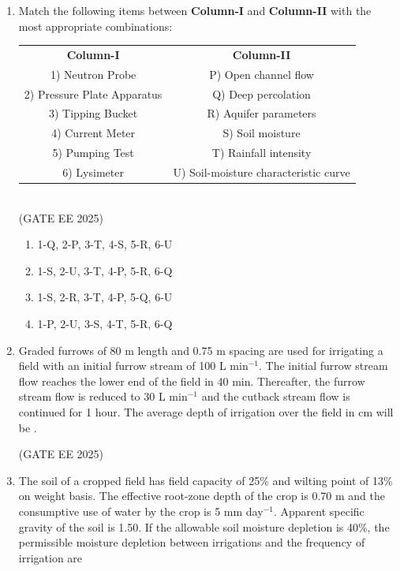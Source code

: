 \documentclass[journal,12pt,onecolumn]{IEEEtran}
\theoremstyle{remark}
\begin{document}
\begin{enumerate}
\item Match the following items between \textbf{Column-I} and \textbf{Column-II} with the most appropriate combinations: \\[6pt]

\begin{tabular}{cc}
\textbf{Column-I} & \textbf{Column-II} \\
1) Neutron Probe & P) Open channel flow \\
2) Pressure Plate Apparatus & Q) Deep percolation \\
3) Tipping Bucket & R) Aquifer parameters \\
4) Current Meter & S) Soil moisture \\
5) Pumping Test & T) Rainfall intensity \\
6) Lysimeter & U) Soil-moisture characteristic curve \\
\end{tabular} \\[6pt]

\hfill(GATE EE 2025)

\begin{multicols}{2}
\begin{enumerate}
    \item 1-Q, 2-P, 3-T, 4-S, 5-R, 6-U 
    \item 1-S, 2-U, 3-T, 4-P, 5-R, 6-Q 
    \item 1-S, 2-R, 3-T, 4-P, 5-Q, 6-U 
    \item 1-P, 2-U, 3-S, 4-T, 5-R, 6-Q 
\end{enumerate}
\end{multicols}

\item Graded furrows of 80 m length and 0.75 m spacing are used for irrigating a field with an initial furrow stream of 100 L min$^{-1}$. The initial furrow stream flow reaches the lower end of the field in 40 min. Thereafter, the furrow stream flow is reduced to 30 L min$^{-1}$ and the cutback stream flow is continued for 1 hour. The average depth of irrigation over the field in cm will be \underline{\hspace{2cm}}. 

\hfill(GATE EE 2025)
\newpage
\item The soil of a cropped field has field capacity of 25\% and wilting point of 13\% on weight basis. The effective root-zone depth of the crop is 0.70 m and the consumptive use of water by the crop is 5 mm day$^{-1}$. Apparent specific gravity of the soil is 1.50. If the allowable soil moisture depletion is 40\%, the permissible moisture depletion between irrigations and the frequency of irrigation are


\end{enumerate}
\end{document}
